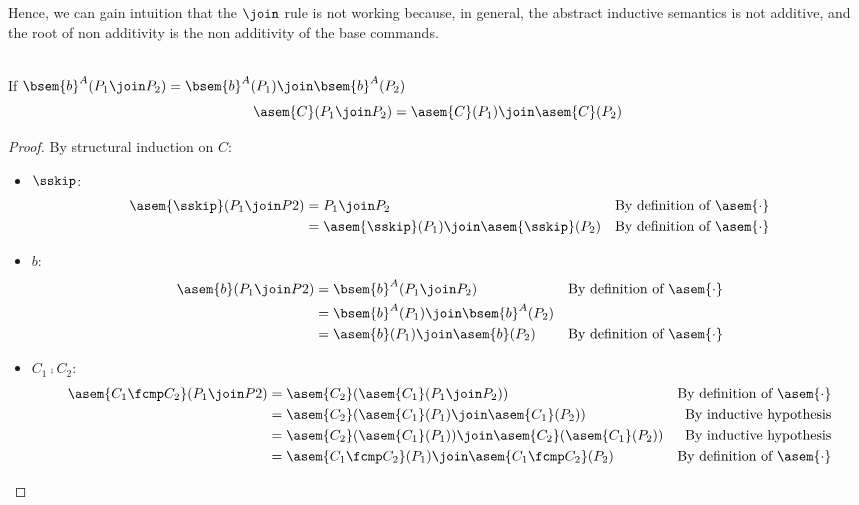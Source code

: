 Hence, we can gain intuition that the $\join$ rule is not working because, in
general, the abstract inductive semantics is not additive, and the root of non
additivity is the non additivity of the base commands.

\begin{theorem} $\;$\\
  \label{thm:additivity}
  If $\bsem{b}^A(P_1 \join P_2) = \bsem{b}^A(P_1) \join \bsem{b}^A(P_2)$
  $$\asem{C}(P_1 \join P_2) = \asem{C}(P_1) \join \asem{C}(P_2)$$
\end{theorem}
\begin{proof}
  By structural induction on $C$:
  \begin{itemize}
    \item $\sskip$:
      \begin{align*}
        \asem{\sskip}(P_1 \join P2)
          &= P_1 \join P_2 
          &\text{By definition of $\asem{\cdot}$} \\
          &= \asem{\sskip}(P_1) \join \asem{\sskip}(P_2)
          &\text{By definition of $\asem{\cdot}$} \\
      \end{align*}
    \item $b$:
      \begin{align*}
        \asem{b}(P_1 \join P2)
          &= \bsem{b}^A(P_1 \join P_2)
          &\text{By definition of $\asem{\cdot}$} \\
          &= \bsem{b}^A(P_1) \join \bsem{b}^A(P_2) \\
          &= \asem{b}(P_1) \join \asem{b}(P_2)
          &\text{By definition of $\asem{\cdot}$} \\
      \end{align*}
    \item $C_1 \fcmp C_2$:
      \begin{align*}
        \asem{C_1 \fcmp C_2}(P_1 \join P2)
          &= \asem{C_2}(\asem{C_1}(P_1 \join P_2))
          &\text{By definition of $\asem{\cdot}$} \\
          &= \asem{C_2}(\asem{C_1}(P_1) \join \asem{C_1}(P_2))
          &\text{By inductive hypothesis} \\
          &= \asem{C_2}(\asem{C_1}(P_1)) \join \asem{C_2}(\asem{C_1}(P_2))
          &\text{By inductive hypothesis} \\
          &= \asem{C_1 \fcmp C_2}(P_1) \join \asem{C_1 \fcmp C_2}(P_2)
          &\text{By definition of $\asem{\cdot}$} \\

\end{align*}
\end{itemize}
\end{proof}
